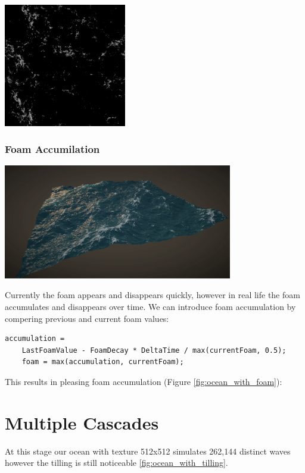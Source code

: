 \begin{minipage}{1\textwidth}
    \centering
    \includegraphics[width=0.40\textwidth]{"images/foam_texture.png"}
    \label{fig:foam_texture}
\end{minipage}

\subsubsection{Foam Accumilation}

\begin{minipage}{1\textwidth}
    \centering
    \includegraphics[width=0.75\textwidth]{"images/ocean_with_foam.png"}
    \label{fig:ocean_with_foam}
\end{minipage}

Currently the foam appears and disappears quickly, however in real life the foam accumulates and disappears over time.
We can introduce foam accumulation by compering previous and current foam values:
\begin{lstlisting}[caption={Foam Accumilation}, frame=single, numberstyle=\small\color{gray}, captionpos=b]
    accumulation = 
    LastFoamValue - FoamDecay * DeltaTime / max(currentFoam, 0.5);
    foam = max(accumulation, currentFoam);
\end{lstlisting}
This results in pleasing foam accumulation (Figure \ref{fig:ocean_with_foam}):

\section{Multiple Cascades}
At this stage our ocean with texture 512x512 simulates 262,144 distinct waves however the tilling is still noticeable \ref{fig:ocean_with_tilling}.

